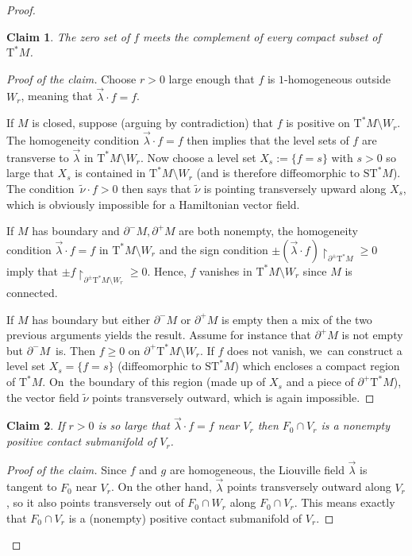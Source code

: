 \documentclass[JEP,XML,SOM,Unicode]{cedram}
\newcommand{\sT}{\mathrm{T}^\ast}
\newcommand{\sST}{\mathrm{ST}^\ast}
\newcommand{\hnu}{\tilde\nu}
\newcommand{\de}{\mathrel{:=}}
\newcommand{\rst}[1]{{\upharpoonright}_{\!#1}}
\let\del\partial
\theoremstyle{plain}
\newtheorem*{claim}{Claim}
\theoremstyle{definition}
\begin{document}
\begin{proof}
\begin{claim}
The zero set of $f$ meets the complement of every compact subset of $\sT M$.
\end{claim}

\begin{proof}[Proof of the claim]
Choose $r>0$ large enough that $f$ is $1$-homogeneous outside~$W_r$, meaning
that $\vec\lambda \cdot f = f$.

If $M$ is closed, suppose (arguing by contradiction) that $f$ is positive on
$\sT M \setminus W_r$. The homogeneity condition $\vec\lambda \cdot f = f$ then implies
that the level sets of $f$ are transverse to $\vec\lambda$ in $\sT M \setminus W_r$. Now
choose a level set $X_s \de \{f=s\}$ with $s>0$ so large that $X_s$ is contained
in $\sT M \setminus W_r$ (and is therefore diffeomorphic to $\sST M$). The condition~$\hnu \cdot f > 0$ then says that $\hnu$ is pointing transversely upward along
$X_s$, which is obviously impossible for a Hamiltonian vector field.

If $M$ has boundary and $\del^-M, \del^+M$ are both nonempty, the homogeneity
condition $\vec\lambda \cdot f = f$ in $\sT M \setminus W_r$ and the sign condition $\pm
(\vec\lambda \cdot f) \rst{ \del^\pm \sT M } \ge 0$ imply that $\pm f \rst{
\del^\pm\sT M\setminus W_r } \ge 0$. Hence, $f$ vanishes in $\sT M \setminus W_r$ since $M$ is
connected.

If $M$ has boundary but either $\del^-M$ or $\del^+M$ is empty then a mix of the
two previous arguments yields the result. Assume for instance that $\del^+M$ is
not empty but $\del^-M$~is. Then $f \ge 0$ on $\del^+\sT M \setminus W_r$. If $f$ does
not vanish, we~can construct a level set $X_s = \{f=s\}$ (diffeomorphic to $\sST
M$) which encloses a compact region of $\sT M$. On~the boundary of this region
(made up of $X_s$ and a piece of $\del^+\sT M$), the vector field $\hnu$ points
transversely outward, which is again impossible.
\end{proof}

\begin{claim}
If $r>0$ is so large that $\vec\lambda \cdot f = f$ near $V_r$ then $F_0 \cap
V_r$ is a nonempty positive contact submanifold of $V_r$.
\end{claim}

\begin{proof}[Proof of the claim]
Since $f$ and $g$ are homogeneous, the Liouville field $\vec\lambda$ is tangent
to $F_0$ near $V_r$. On the other hand, $\vec\lambda$ points transversely
outward along $V_r$, so it also points transversely out of $F_0 \cap W_r$ along
$F_0 \cap V_r$. This means exactly that $F_0 \cap V_r$ is a
(nonempty) positive contact submanifold of $V_r$.
\end{proof}


\end{proof}
\end{document}
